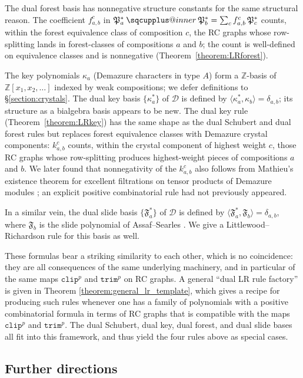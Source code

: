 \documentclass[a4paper,fleqn]{cas-sc}
\makeatletter
\newcommand{\sqcupplus@inner}[2]{%
  \vcenter{\hbox{\ooalign{%
    \hfil$\m@th#1\sqcup$\hfil\cr
    \hfil\raisebox{0.15ex}{$\m@th#1\scriptscriptstyle+$}\hfil\cr
  }}}%
}
\newcommand{\sqcupplus}{\mathbin{\mathpalette\sqcupplus@inner\relax}}
\theoremstyle{definition}
\theoremstyle{remark}
\numberwithin{equation}{subsection}
\newcommand{\trm}{\mathtt{trim}}
\newcommand{\clp}{\mathtt{clip}}
\newcommand{\slide}{\mathfrak{F}}
\newcommand{\dcoma}{\mathcal{D}}
\newcommand{\forest}{\mathfrak{P}}
\makeatother
\begin{document}
The dual forest basis has nonnegative structure constants for the same structural reason. The coefficient $f_{a,b}^c$ in $\forest_a^*\sqcupplus\forest_b^*=\sum_c f_{a,b}^c\,\forest_c^*$ counts, within the forest equivalence class of composition $c$, the RC graphs whose row-splitting lands in forest-classes of compositions $a$ and $b$; the count is well-defined on equivalence classes and is nonnegative (Theorem~\ref{theorem:LRforest}).

The key polynomials $\kappa_a$ (Demazure characters in type $A$) form a $\mathbb{Z}$-basis of $\mathbb{Z}[x_1,x_2,\ldots]$ indexed by weak compositions; we defer definitions to \S\ref{section:crystals}. The dual key basis $\{\kappa_a^*\}$ of $\dcoma$ is defined by $\langle\kappa_a^*,\kappa_b\rangle=\delta_{a,b}$; its structure as a bialgebra basis appears to be new. The dual key rule (Theorem~\ref{theorem:LRkey}) has the same shape as the dual Schubert and dual forest rules but replaces forest equivalence classes with Demazure crystal components: $k_{a,b}^c$ counts, within the crystal component of highest weight $c$, those RC graphs whose row-splitting produces highest-weight pieces of compositions $a$ and $b$. We later found that nonnegativity of the $k_{a,b}^c$ also follows from Mathieu's existence theorem for excellent filtrations on tensor products of Demazure modules \cite{mathieu1990filtrations}; an explicit positive combinatorial rule had not previously appeared.

In a similar vein, the dual slide basis $\{\slide_a^*\}$ of $\dcoma$ is defined by $\langle\slide_a^*,\slide_b\rangle=\delta_{a,b}$, where $\slide_b$ is the slide polynomial of Assaf--Searles \cite{assaf2017slide}. We give a Littlewood--Richardson rule for this basis as well.

These formulas bear a striking similarity to each other, which is no coincidence: they are all consequences of the same underlying machinery, and in particular of the same maps $\clp^p$ and $\trm^p$ on RC graphs. A general ``dual LR rule factory'' is given in Theorem \ref{theorem:general_lr_template}, which gives a recipe for producing such rules whenever one has a family of polynomials with a positive combinatorial formula in terms of RC graphs that is compatible with the maps $\clp^p$ and $\trm^p$. The dual Schubert, dual key, dual forest, and dual slide bases all fit into this framework, and thus yield the four rules above as special cases.


\subsection*{Further directions}
\end{document}
